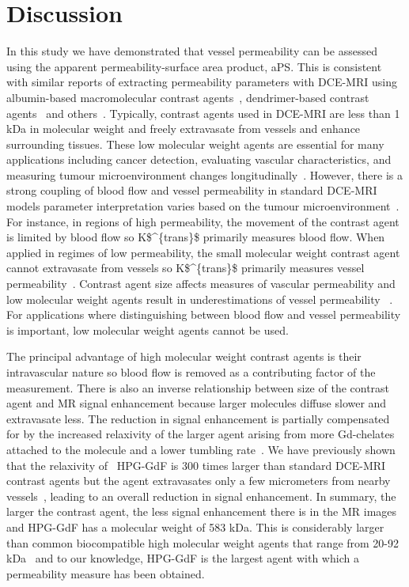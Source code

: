 \section{Discussion}

In this study we have demonstrated that vessel permeability can be assessed using the apparent permeability-surface area product, \acs{aPS}.
This is consistent with similar reports of extracting permeability parameters with \acs{DCE-MRI} using albumin-based macromolecular contrast agents~\cite{DaldrupLink:2004gy,Turetschek:2001wu}, dendrimer-based contrast agents~\cite{deLussanet:2005cb} and others~\cite{Turetschek:2004bw}.
Typically, contrast agents used in \acs{DCE-MRI} are less than 1 kDa in molecular weight and freely extravasate from vessels and enhance surrounding tissues.
These low molecular weight agents are essential for many applications including cancer detection,  evaluating vascular characteristics, and measuring tumour microenvironment changes longitudinally~\cite{Padhani:2002cj}.
However, there is a strong coupling of blood flow and vessel permeability in standard \acs{DCE-MRI} models parameter interpretation varies based on the tumour microenvironment~\cite{Gerstner:2008ba}.
For instance, in regions of high permeability, the movement of the contrast agent is limited by blood flow so \acs{K$^{trans}$} primarily measures blood flow.
When applied in regimes of low permeability, the small molecular weight contrast agent cannot extravasate from vessels so \acs{K$^{trans}$} primarily measures vessel permeability~\cite{Tofts:1999we}.
Contrast agent size affects measures of vascular permeability and low molecular weight agents result in underestimations of vessel permeability ~\cite{deLussanet:2005cb}.
For applications where distinguishing between blood flow and vessel permeability is important, low molecular weight agents cannot be used.

The principal advantage of high molecular weight contrast agents is their intravascular nature so blood flow is removed as a contributing factor of the measurement.
There is also an inverse relationship between size of the contrast agent and MR signal enhancement because larger molecules diffuse slower and extravasate less.
The reduction in signal enhancement is partially compensated for by the increased relaxivity of the larger agent arising from more Gd-chelates attached to the molecule and a lower tumbling rate~\cite{Barrett:2006jx}.
We have previously shown that the relaxivity of ~\acs{HPG-GdF} is 300 times larger than standard \acs{DCE-MRI} contrast agents but the agent extravasates only a few micrometers from nearby vessels~\cite{Baker:2015cob}, leading to an overall reduction in signal enhancement.
In summary, the larger the contrast agent, the less signal enhancement there is in the MR images and \acs{HPG-GdF} has a molecular weight of 583 kDa.
This is considerably larger than common biocompatible high molecular weight agents that range from 20-92 kDa~\cite{Barrett:2006jx} and to our knowledge, \acs{HPG-GdF} is the largest agent with which a permeability measure has been obtained.


